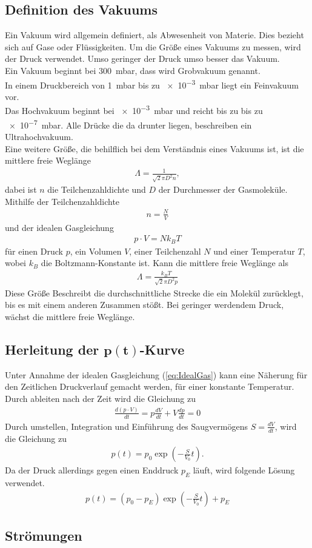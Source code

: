 \subsection{Definition des Vakuums}
Ein Vakuum wird allgemein definiert, als Abwesenheit von Materie.
Dies bezieht sich auf Gase oder Flüssigkeiten. Um die Größe eines Vakuums zu messen, wird der Druck verwendet. Umso geringer der Druck umso besser das Vakuum.\\
Ein Vakuum beginnt bei \SI{300}{\milli\bar}, dass wird Grobvakuum genannt.\\
In einem Druckbereich von \SI{1}{\milli\bar} bis zu \SI{e-3}{\milli\bar} liegt ein Feinvakuum vor.\\
Das Hochvakuum beginnt bei \SI{e-3}{\milli\bar} und reicht bis zu bis zu \SI{e-7}{\milli\bar}. Alle Drücke die da drunter liegen, beschreiben ein Ultrahochvakuum.\\
Eine weitere Größe, die behilflich bei dem Verständnis eines Vakuums ist, ist die mittlere freie Weglänge
\begin{align}
\Lambda = \frac{1}{\sqrt{2}\pi D^2n},
\end{align}
dabei ist $n$ die Teilchenzahldichte und $D$ der Durchmesser der Gasmoleküle. Mithilfe der Teilchenzahldichte 
\begin{align}
n=\frac{N}{V}
\end{align}
und der idealen Gasgleichung
\begin{align}
p\cdot V = N k_B T \label{eq:IdealGas}
\end{align}
für einen Druck $p$, ein Volumen $V$, einer Teilchenzahl $N$ und einer Temperatur $T$, wobei $k_B$ die Boltzmann-Konstante ist.
Kann die mittlere freie Weglänge als
\begin{align}
\Lambda = \frac{k_BT}{\sqrt{2}\pi D^2p}
\end{align} 
Diese Größe Beschreibt die durchschnittliche Strecke die ein Molekül zurücklegt, bis es mit einem anderen Zusammen stößt. Bei geringer werdendem Druck, wächst die mittlere freie Weglänge.

\subsection[Herleitung der $p(t)$-Kurve]{Herleitung der $\mathbf{p(t)}$-Kurve}
Unter Annahme der idealen Gasgleichung (\ref{eq:IdealGas})
kann eine Näherung für den Zeitlichen Druckverlauf gemacht werden, für einer konstante Temperatur.
Durch ableiten nach der Zeit wird die Gleichung zu
\begin{align}
\frac{d\left(p\cdot V \right)}{dt}=p\frac{dV}{dt}+V\frac{dp}{dt}=0
\end{align}
Durch umstellen, Integration und Einführung des Saugvermögens $S=\frac{dV}{dt}$, wird die Gleichung zu
\begin{align}
p(t) = p_0 \exp\left(-\frac{S}{V_0}t\right).
\end{align}
Da der Druck allerdings gegen einen Enddruck $p_E$ läuft, wird folgende Lösung verwendet.
\begin{align}
p(t) = \left( p_0-p_E \right) \exp\left(-\frac{S}{V_0}t\right) + p_E
\end{align}

\subsection{Strömungen}